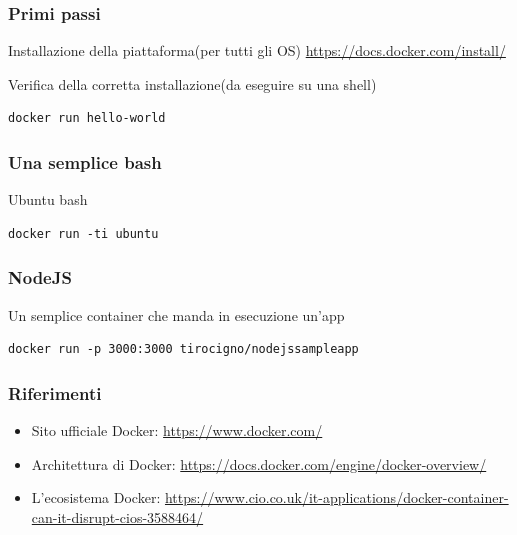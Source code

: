 \documentclass{beamer}
\begin{document}
\begin{frame}[fragile]
\frametitle{Primi passi}

\begin{block}{Installazione della piattaforma(per tutti gli OS)}
\href{https://docs.docker.com/install}{https://docs.docker.com/install/}
\end{block}

\begin{block}{Verifica della corretta installazione(da eseguire su una shell)}
\begin{verbatim}
docker run hello-world
\end{verbatim}
\end{block}
\end{frame}
\begin{frame}[fragile]
\frametitle{Una semplice bash}
\begin{block}{Ubuntu bash}
\begin{verbatim}
docker run -ti ubuntu
\end{verbatim}
\end{block}
\end{frame}


\begin{frame}[fragile]
\frametitle{NodeJS}
\begin{block}{Un semplice container che manda in esecuzione un'app}
\begin{verbatim}
docker run -p 3000:3000 tirocigno/nodejssampleapp
\end{verbatim}
\end{block}
\end{frame}

\begin{frame}
\frametitle{Riferimenti}
\begin{itemize}
\item Sito ufficiale Docker: \href{https://www.docker.com/}{https://www.docker.com/}
\item Architettura di Docker: \href{https://docs.docker.com/engine/docker-overview/}{https://docs.docker.com/engine/docker-overview/}
\item L'ecosistema Docker: \href{https://www.cio.co.uk/it-applications/docker-container-can-it-disrupt-cios-3588464/}{https://www.cio.co.uk/it-applications/docker-container-can-it-disrupt-cios-3588464/}

\end{itemize}
\end{frame}




\begin{frame}
\titlepage %
\end{frame}

\end{document}
